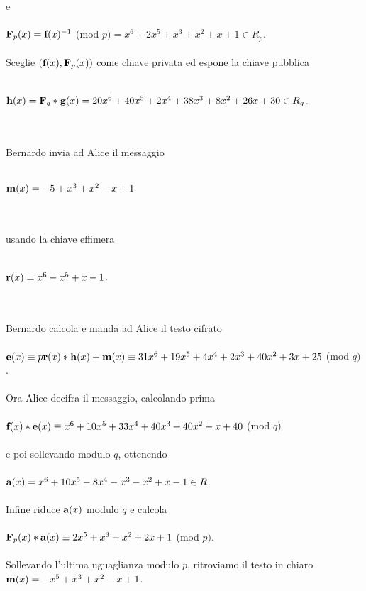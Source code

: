 \documentclass[a4paper,12pt]{report}
\theoremstyle{plain}
\theoremstyle{definition}
\theoremstyle{remark}
\begin{document}
\\ \\ e \\ \\ $\textbf F_	p(x)=\textbf f(x)^{-1} $ (mod $p)=x^6+2x^5+x^3+x^2+x+1\in R_p$. \\ \\Sceglie $(\textbf f(x), \textbf F_p(x))$ come chiave privata ed espone la chiave pubblica \\ \\ \centerline{$\textbf h(x)=\textbf F_q*\textbf g(x)=20x^6+40x^5+2x^4+38x^3+8x^2+26x+30 \in R_q$.} \\ \\ Bernardo invia ad Alice il messaggio \\ \\ \centerline{$\textbf m(x)=-5+x^3+x^2-x+1$} \\ \\ usando la chiave effimera \\ \\ \centerline{$\textbf r(x)=x^6-x^5+x-1$.}\\ \\Bernardo calcola e manda ad Alice il testo cifrato \\ \\ $\textbf e(x)\equiv p\textbf r(x)*\textbf h(x)+\textbf m(x)\equiv31x^6+19x^5+4x^4+2x^3+40x^2+3x+25$ (mod $q)$. \\ \\Ora Alice decifra il messaggio, calcolando prima \\ \\ $\textbf f(x)*\textbf e(x)\equiv x^6+10x^5+33x^4+40x^3+40x^2+x+40 $ (mod $q)$\\ \\ e poi sollevando modulo $q$, ottenendo \\ \\ $\textbf a(x)=x^6+10x^5-8x^4-x^3-x^2+x-1 \in R$. \\ \\Infine riduce $\textbf a(x)$ modulo $q$ e calcola \\ \\ $\textbf F_p(x)*\textbf a(x)\equiv 2x^5+x^3+x^2+2x+1 $ (mod $p)$. \\ \\ Sollevando l'ultima uguaglianza modulo $p$, ritroviamo il testo in chiaro $\textbf m(x)=-x^5+x^3+x^2-x+1$.\\ \\ 
\end{document}
